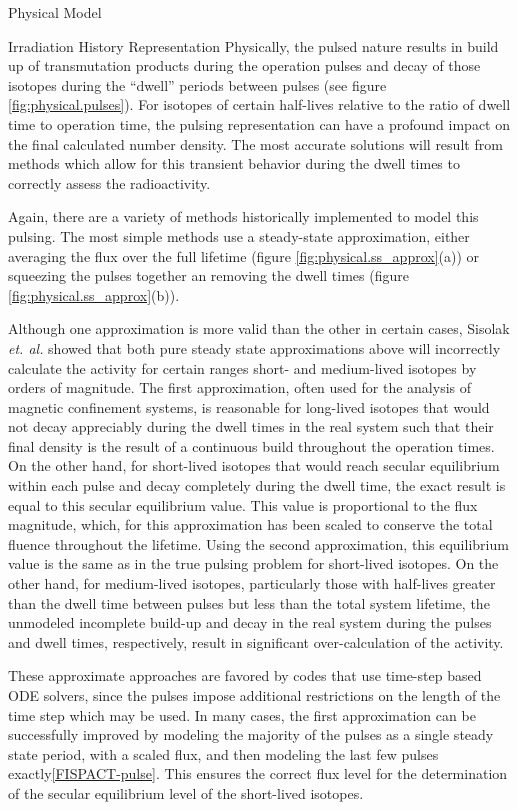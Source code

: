\begin{chapter}{Physical Model\label{chap:physical}}
\begin{section}{Irradiation History Representation}
  Physically, the pulsed nature results in build up of transmutation
  products during the operation pulses and decay of those isotopes
  during the ``dwell'' periods between pulses (see figure
  \ref{fig:physical.pulses}).  For isotopes of certain half-lives
  relative to the ratio of dwell time to operation time, the pulsing
  representation can have a profound impact on the final calculated
  number density.  The most accurate solutions will result from
  methods which allow for this transient behavior during the dwell
  times to correctly assess the radioactivity.
  
  Again, there are a variety of methods historically implemented to
  model this pulsing.  The most simple methods use a steady-state
  approximation, either averaging the flux over the full lifetime
  (figure \ref{fig:physical.ss_approx}(a)) or squeezing the pulses
  together an removing the dwell times (figure
  \ref{fig:physical.ss_approx}(b)).
  
  Although one approximation is more valid than the other in certain
  cases, Sisolak {\em et. al.}\cite{bib:PULSAR} showed that both pure
  steady state approximations above will incorrectly calculate the
  activity for certain ranges short- and medium-lived isotopes by
  orders of magnitude.  The first approximation, often used for the
  analysis of magnetic confinement systems, is reasonable for
  long-lived isotopes that would not decay appreciably during the
  dwell times in the real system such that their final density is the
  result of a continuous build throughout the operation times.  On the
  other hand, for short-lived isotopes that would reach secular
  equilibrium within each pulse and decay completely during the dwell
  time, the exact result is equal to this secular equilibrium value.
  This value is proportional to the flux magnitude, which, for this
  approximation has been scaled to conserve the total fluence
  throughout the lifetime.  Using the second approximation, this
  equilibrium value is the same as in the true pulsing problem for
  short-lived isotopes.  On the other hand, for medium-lived isotopes,
  particularly those with half-lives greater than the dwell time
  between pulses but less than the total system lifetime, the
  unmodeled incomplete build-up and decay in the real system during
  the pulses and dwell times, respectively, result in significant
  over-calculation of the activity.
  
  These approximate approaches are favored by codes that use time-step
  based ODE solvers, since the pulses impose additional restrictions
  on the length of the time step which may be used.  In many cases,
  the first approximation can be successfully improved by modeling
  the majority of the pulses as a single steady state period, with a
  scaled flux, and then modeling the last few pulses
  exactly\ref{FISPACT-pulse}.  This ensures the correct flux level for
  the determination of the secular equilibrium level of the
  short-lived isotopes.
  

\end{section}
\end{chapter}
